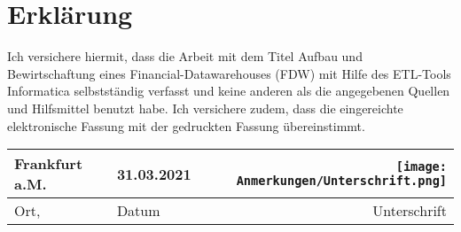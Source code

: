 \chapter*{Erklärung}
Ich versichere hiermit, dass die Arbeit mit dem Titel\newline\newline
\glqq Aufbau und Bewirtschaftung eines Financial-Datawarehouses (FDW) mit Hilfe des ETL-Tools Informatica\grqq\newline\newline
selbstständig verfasst und keine anderen als die angegebenen Quellen und Hilfsmittel benutzt habe. 
Ich versichere zudem, dass die eingereichte elektronische Fassung mit der gedruckten Fassung übereinstimmt.\newline\newline\newline\newline\newline
\begin{tabular}[h]{p{3cm}p{5cm}r}
	Frankfurt a.M.  & 31.03.2021 &  \texttt{[image: Anmerkungen/Unterschrift.png]}\\
	\hline
	Ort, & Datum & Unterschrift \\
\end{tabular}
